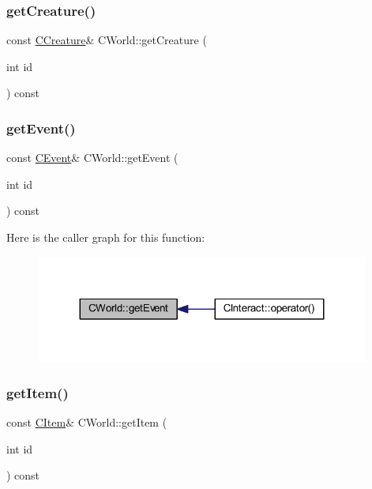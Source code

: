 \subsubsection{\texorpdfstring{get\+Creature()}{getCreature()}}
{\footnotesize\ttfamily const \mbox{\hyperlink{class_c_creature}{C\+Creature}}\& C\+World\+::get\+Creature (\begin{DoxyParamCaption}\item[{int}]{id }\end{DoxyParamCaption}) const\hspace{0.3cm}{\ttfamily [inline]}}

\mbox{\label{class_c_world_a88b90cecbca7d5bcb6575b6a9d94e026}} 
\subsubsection{\texorpdfstring{get\+Event()}{getEvent()}}
{\footnotesize\ttfamily const \mbox{\hyperlink{class_c_event}{C\+Event}}\& C\+World\+::get\+Event (\begin{DoxyParamCaption}\item[{int}]{id }\end{DoxyParamCaption}) const\hspace{0.3cm}{\ttfamily [inline]}}

Here is the caller graph for this function\+:\nopagebreak
\begin{figure}[H]
\begin{center}
\leavevmode
\includegraphics[width=311pt]{class_c_world_a88b90cecbca7d5bcb6575b6a9d94e026_icgraph}
\end{center}
\end{figure}
\mbox{\label{class_c_world_aae01822f61bfe35284a1ca9c02bdb1a5}} 
\subsubsection{\texorpdfstring{get\+Item()}{getItem()}}
{\footnotesize\ttfamily const \mbox{\hyperlink{class_c_item}{C\+Item}}\& C\+World\+::get\+Item (\begin{DoxyParamCaption}\item[{int}]{id }\end{DoxyParamCaption}) const\hspace{0.3cm}{\ttfamily [inline]}}

